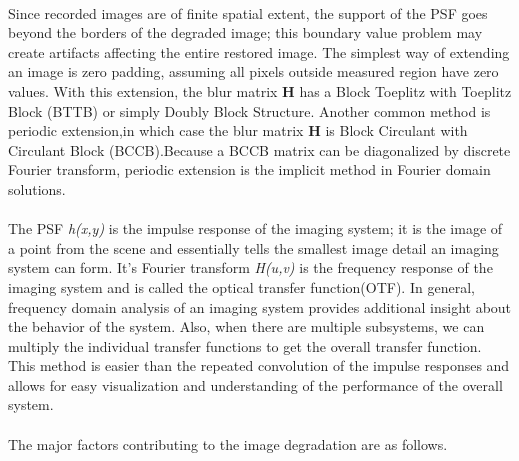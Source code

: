 \documentclass[a4paper]{book}
\begin{document}
	\paragraph*{}Since recorded images are of finite spatial extent, the support of the PSF goes beyond the borders of the degraded image; this boundary value problem may create artifacts affecting the entire restored image\cite{Woods85boundary}. The simplest way of extending an image is zero padding, assuming all pixels outside measured region have zero values. With this extension, the blur matrix \textbf{H} has a Block Toeplitz with Toeplitz Block (BTTB) or simply Doubly Block Structure.\cite{Ng99afast} Another common method is periodic extension,in which case the blur matrix \textbf{H} is Block Circulant with Circulant Block (BCCB).Because a BCCB matrix can be diagonalized by discrete Fourier transform, periodic extension is the implicit method in Fourier domain solutions.


	\paragraph*{}The PSF \textit{h(x,y)} is the impulse response of the imaging system; it is the image of a point from the scene and essentially tells the smallest image detail an imaging system can form. It's Fourier transform \textit{H(u,v)} is the frequency response of the imaging system and is called the optical transfer function(OTF). In general, frequency domain analysis of an imaging system provides additional insight about the behavior of the system. Also, when there are multiple subsystems, we can multiply the individual transfer functions to get the overall transfer function. This method is easier than the repeated convolution of the impulse responses and allows for easy visualization and understanding of the performance of the overall system.
	
	
	\paragraph*{}The major factors contributing to the image degradation are as follows.
	
\end{document}

